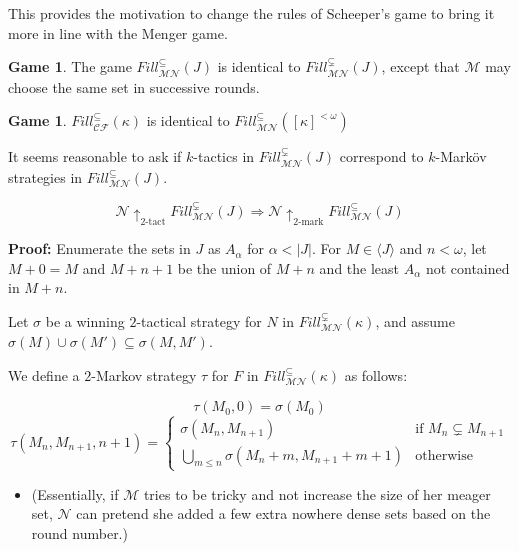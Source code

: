 \documentclass{beamer}
\theoremstyle{theorem}
\theoremstyle{definition}
\newtheorem{game}[theorem]{Game}
\newcommand{\ktactwin}[1]{\uparrow_{#1\text{-tact}}}
\newcommand{\kmarkwin}[1]{\uparrow_{#1\text{-mark}}}
\newcommand{\fillgame}[1]{Fill^{\subseteq}_{\pl M\pl N}(#1)}
\newcommand{\sfillgame}[1]{Fill^{\subsetneq}_{\pl M\pl N}(#1)}
\newcommand{\kfillgame}[1]{Fill^{\subseteq}_{\pl C\pl F}(#1)}
\newcommand{\<}{\langle}
\renewcommand{\>}{\rangle}
\newcommand{\pl}[1]{\mathscr{#1}}
\begin{document}
\begin{frame}

  This provides the motivation to change the rules of Scheeper's game to bring it more in line with the Menger game.
  \pause

  \begin{game}
    The game $\fillgame{J}$ is identical to $\sfillgame{J}$, except that $\pl M$ may choose the same set in successive rounds.
  \end{game}

  \begin{game}
    $\kfillgame{\kappa}$ is identical to $\fillgame{[\kappa]^{<\omega}}$
  \end{game}

  \pause

  It seems reasonable to ask if $k$-tactics in $\sfillgame{J}$ correspond to $k$-Mark\"ov strategies in $\fillgame{J}$.

\end{frame}

\begin{frame}
  \begin{theorem}
    \[\pl N\ktactwin{2}\sfillgame{J} \Rightarrow \pl N\kmarkwin{2}\fillgame{J}\]
  \end{theorem}

  \pause

  \textbf{Proof:}
    Enumerate the sets in $J$ as $A_\alpha$ for $\alpha<|J|$. For $M\in \<J\>$ and $n<\omega$, let $M+0=M$ and $M+n+1$ be the union of $M+n$ and the least $A_\alpha$ not contained in $M+n$.

    \pause\vspace{12pt}

    Let $\sigma$ be a winning $2$-tactical strategy for $N$ in $\sfillgame{\kappa}$, and assume $\sigma(M)\cup\sigma(M')\subseteq\sigma(M,M')$.

    \pause\vspace{12pt}

    We define a $2$-Markov strategy $\tau$ for $F$ in $\fillgame{\kappa}$ as follows:
\end{frame}

\begin{frame}{}

{\small
      \[
        \tau(M_0,0) = \sigma(M_0)
      \]
      \[
        \tau(M_{n},M_{n+1},n+1) = \left\{
          \begin{array}{ll}
            \sigma(M_{n},M_{n+1}) & \text{if } M_n\subsetneq M_{n+1} \\
            \bigcup_{m\leq n}\sigma(M_n+m,M_{n+1}+m+1) & \text{otherwise}
          \end{array}
        \right.
      \]
}

\pause
\begin{itemize}
\item (Essentially, if $\pl M$ tries to be tricky and not increase the size of her meager set, $\pl N$ can pretend she added a few extra nowhere dense sets based on the round number.)
\end{itemize}
\end{frame}
\end{document}
